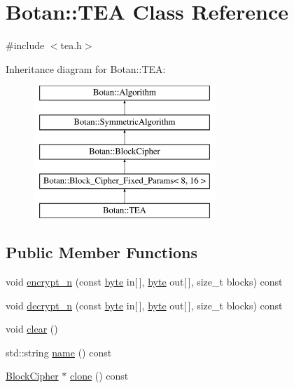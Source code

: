 \hypertarget{classBotan_1_1TEA}{\section{Botan\-:\-:T\-E\-A Class Reference}
\label{classBotan_1_1TEA}
}


{\ttfamily \#include $<$tea.\-h$>$}

Inheritance diagram for Botan\-:\-:T\-E\-A\-:\begin{figure}[H]
\begin{center}
\leavevmode
\includegraphics[height=5.000000cm]{classBotan_1_1TEA}
\end{center}
\end{figure}
\subsection*{Public Member Functions}
\begin{DoxyCompactItemize}
\item 
void \hyperlink{classBotan_1_1TEA_a6bd801915bdfa8ba9c2a66a0843579dc}{encrypt\-\_\-n} (const \hyperlink{namespaceBotan_a7d793989d801281df48c6b19616b8b84}{byte} in\mbox{[}$\,$\mbox{]}, \hyperlink{namespaceBotan_a7d793989d801281df48c6b19616b8b84}{byte} out\mbox{[}$\,$\mbox{]}, size\-\_\-t blocks) const 
\item 
void \hyperlink{classBotan_1_1TEA_a46b1f670cb2da2deba59b5d41300dd29}{decrypt\-\_\-n} (const \hyperlink{namespaceBotan_a7d793989d801281df48c6b19616b8b84}{byte} in\mbox{[}$\,$\mbox{]}, \hyperlink{namespaceBotan_a7d793989d801281df48c6b19616b8b84}{byte} out\mbox{[}$\,$\mbox{]}, size\-\_\-t blocks) const 
\item 
void \hyperlink{classBotan_1_1TEA_a707886e121e2da62fcbaaf07f6922d60}{clear} ()
\item 
std\-::string \hyperlink{classBotan_1_1TEA_afdb4c4e6ddffa83cb250a4d4058392d1}{name} () const 
\item 
\hyperlink{classBotan_1_1BlockCipher}{Block\-Cipher} $\ast$ \hyperlink{classBotan_1_1TEA_a33db6ca0ec4958aac387c4f1bcd19d92}{clone} () const 
\end{DoxyCompactItemize}
